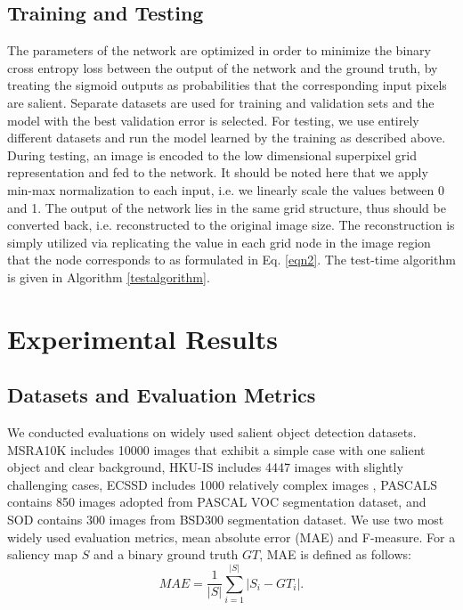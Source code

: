 \documentclass[a4paper,conference]{IEEEtran}
\begin{document}
\subsection{Training and Testing}
The parameters of the network are optimized in order to minimize the binary cross entropy loss between the output of the network and the ground truth, by treating the sigmoid outputs as probabilities that the corresponding input pixels are salient.
Separate datasets are used for training and validation sets and the model with the best validation error is selected.
For testing, we use entirely different datasets and run the model learned by the training as described above.
During testing, an image is encoded to the low dimensional superpixel grid representation and fed to the network.
It should be noted here that we apply min-max normalization to each input, i.e. we linearly scale the values between 0 and 1.
The output of the network lies in the same grid structure, thus should be converted back, i.e. reconstructed to the original image size.
The reconstruction is simply utilized via replicating the value in each grid node in the image region that the node corresponds to as formulated in Eq. \ref{eqn2}.
The test-time algorithm is given in Algorithm \ref{testalgorithm}.





\section{Experimental Results} \label{ExpRes}

\subsection{Datasets and Evaluation Metrics}
We conducted evaluations on widely used salient object detection datasets.
MSRA10K \cite{Liu} includes 10000 images that exhibit a simple case with one salient object and clear background, HKU-IS \cite{Li4} includes 4447 images with slightly challenging cases, ECSSD \cite{Yan} includes 1000 relatively complex images , PASCALS \cite{Li6} contains 850 images adopted from PASCAL VOC segmentation dataset, and SOD \cite{Mohavedi} contains 300 images from BSD300 \cite{Martin} segmentation dataset.
We use two most widely used evaluation metrics, mean absolute error (MAE) and F-measure.
For a saliency map $S$ and a binary ground truth $GT$, MAE is defined as follows:
\begin{equation}
MAE=\frac{1}{|S|}\sum_{i=1}^{|S|}|S_i-GT_i|.
\label{eqn3}
\end{equation}
\end{document}
